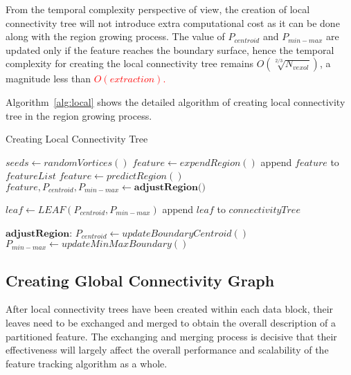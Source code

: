 From the temporal complexity perspective of view, the creation of local connectivity tree will not introduce extra computational cost as it can be done along with the region growing process. The value of $P_{centroid}$ and $P_{min-max}$ are updated only if the feature reaches the boundary surface, hence the temporal complexity for creating the local connectivity tree remains ${O(\sqrt[2/3]{N_{vexol}})}$, a magnitude less than \textcolor{red}{$O(extraction)$.}

Algorithm~\ref{alg:local} shows the detailed algorithm of creating local connectivity tree in the region growing process.
\begin{algorithm}
\caption{Creating Local Connectivity Tree}
\label{alg:local}

\begin{algorithmic}
		\STATE $seeds \leftarrow randomVortices()$
			\STATE $feature \leftarrow expendRegion()$
			\STATE append $feature$ to $featureList$
		\ENDFOR	
	\ELSE
			\STATE $feature \leftarrow predictRegion()$
			\STATE $feature,P_{centroid},P_{min-max} \leftarrow \textbf{adjustRegion()}$
			
			\STATE $leaf \leftarrow LEAF(P_{centroid}, P_{min-max})$
			\STATE append $leaf$ to $connectivityTree$
		\ENDFOR
	\ENDIF
\end{algorithmic}

\begin{algorithmic} \STATE \end{algorithmic}	%

\begin{algorithmic}
\STATE $\textbf{adjustRegion:}$
		\STATE $P_{centroid} \leftarrow updateBoundaryCentroid()$
		\STATE $P_{min-max} \leftarrow updateMinMaxBoundary()$
	\ENDIF
\end{algorithmic}
\end{algorithm}

\subsection{Creating Global Connectivity Graph}

After local connectivity trees have been created within each data block, their leaves need to be exchanged and merged to obtain the overall description of a partitioned feature. The exchanging and merging process is decisive that their effectiveness will largely affect the overall performance and scalability of the feature tracking algorithm as a whole.

